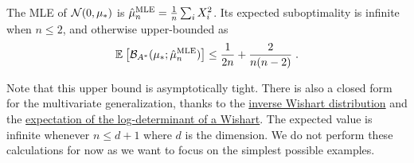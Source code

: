 \documentclass{article}
\newcommand*{\expect}[2][]{\ensuremath{\mathbb{E}_{#1} \left[ #2 \right] }} %
\newcommand{\logpart}{A}
\newcommand{\bregmanconj}{\cB_{\logpart^*}}
\begin{document}
\begin{example}
	\begin{theorem}
	The MLE of ${\mathcal N}(0,\mu_*)$ is $\hat \mu_n^\text{MLE} = \frac{1}{n} \sum_i X_i^2 $.
	Its expected suboptimality is infinite when $n\leq 2$, and otherwise upper-bounded as
	\begin{align}
		 \expect{\bregmanconj( \mu_*; \hat \mu_n^\text{MLE}) }
			\leq \inv{2n} +\frac{2}{n(n-2)} \; .
			\label{eq:MLE_rate}
	\end{align}
\end{theorem}
Note that this upper bound is asymptotically tight.
 There is also a closed form for the multivariate generalization, thanks to the \href{https://en.wikipedia.org/wiki/Inverse-Wishart_distribution}{inverse Wishart distribution} and the \href{https://en.wikipedia.org/wiki/Wishart_distribution#Log-expectation}{expectation of the log-determinant of a Wishart}. The expected value is infinite whenever $n \leq d+1$ where $d$ is the dimension. We do not perform these calculations for now as we want to focus on the simplest possible examples.


\end{example}
\end{document}
